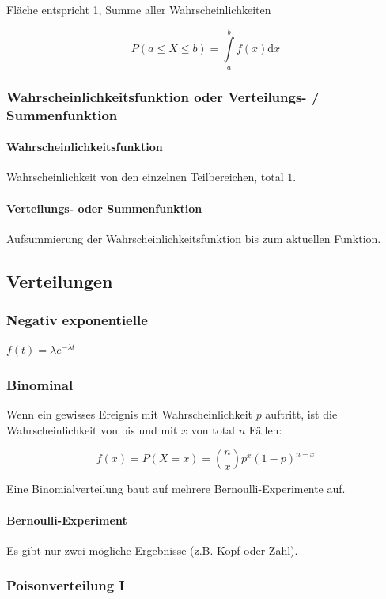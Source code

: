 Fläche entspricht 1, Summe aller Wahrscheinlichkeiten

\[
P(a \leq X \leq b) = \int\limits^b_a{f(x)\mathrm{d}x}
\]

\subsubsection{Wahrscheinlichkeitsfunktion oder Verteilungs- / Summenfunktion}

\paragraph{Wahrscheinlichkeitsfunktion} Wahrscheinlichkeit von den einzelnen Teilbereichen, total $1$.

\paragraph{Verteilungs- oder Summenfunktion} Aufsummierung der Wahrscheinlichkeitsfunktion bis zum aktuellen Funktion.


\subsection{Verteilungen}
\subsubsection{Negativ exponentielle}
$f(t) = \lambda e^{-\lambda t}$

\subsubsection{Binominal}

Wenn ein gewisses Ereignis mit Wahrscheinlichkeit $p$ auftritt, ist die Wahrscheinlichkeit von bis und mit $x$ von total $n$ Fällen:

\[
	f(x) = P(X=x) = \binom{n}{x}p^x(1-p)^{n-x}
\]

Eine Binomialverteilung baut auf mehrere Bernoulli-Experimente auf.

\paragraph{Bernoulli-Experiment}

Es gibt nur zwei mögliche Ergebnisse (z.B. Kopf oder Zahl).

\subsubsection{Poisonverteilung I}

